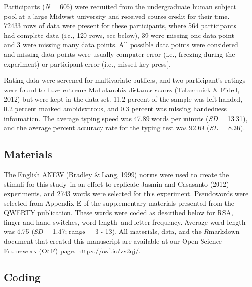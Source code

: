 \documentclass[
  english,
  man]{apa7}
\begin{document}
Participants (\emph{N} = 606) were recruited from the undergraduate human subject pool at a large Midwest university and received course credit for their time. 72433 rows of data were present for these participants, where 564 participants had complete data (i.e., 120 rows, see below), 39 were missing one data point, and 3 were missing many data points. All possible data points were considered and missing data points were usually computer error (i.e., freezing during the experiment) or participant error (i.e., missed key press).

Rating data were screened for multivariate outliers, and two participant's ratings were found to have extreme Mahalanobis distance scores (Tabachnick \& Fidell, 2012) but were kept in the data set. 11.2 percent of the sample was left-handed, 0.2 percent marked ambidextrous, and 0.3 percent was missing handedness information. The average typing speed was 47.89 words per minute (\emph{SD} = 13.31), and the average percent accuracy rate for the typing test was 92.69 (\emph{SD} = 8.36).

\hypertarget{materials}{%
\subsection{Materials}\label{materials}}

The English ANEW (Bradley \& Lang, 1999) norms were used to create the stimuli for this study, in an effort to replicate Jasmin and Casasanto (2012) experiments, and 2743 words were selected for this experiment. Pseudowords were selected from Appendix E of the supplementary materials presented from the QWERTY publication. These words were coded as described below for RSA, finger and hand switches, word length, and letter frequency. Average word length was 4.75 (\emph{SD} = 1.47; range = 3 - 13). All materials, data, and the \emph{R}markdown document that created this manuscript are available at our Open Science Framework (OSF) page: \url{https://osf.io/zs2qj/}.

\hypertarget{coding}{%
\subsection{Coding}\label{coding}}
\end{document}
